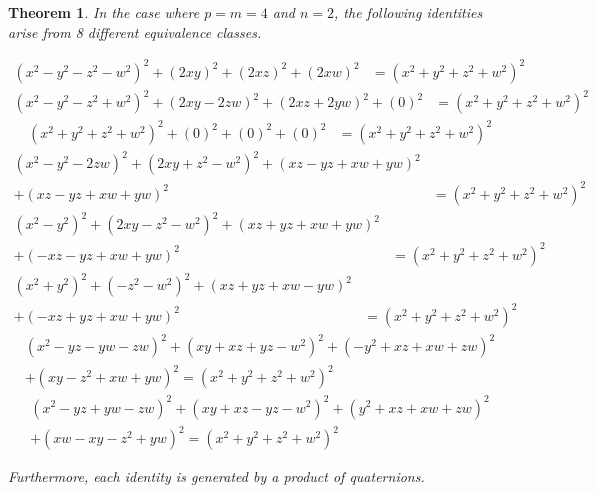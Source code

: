 \documentclass[12pt,table]{article}
\newtheorem{theorem}{Theorem}[section]
\theoremstyle{definition}
\theoremstyle{remark}
\numberwithin{equation}{section}
\begin{document}
\begin{theorem}
\label{theorem_8_classes}
In the case where  $p = m = 4$ and $n = 2$,
the following identities 
arise from 8 different
equivalence classes.

    \begin{align}
    \label{Identity_1}
    (x^2 - y^2 - z^2 - w^2 )^2 + (2xy)^2 + (2xz)^2 + (2xw)^2 
    &= (x^2 + y^2 + z^2 + w^2)^2 
\end{align}
\begin{align}
\label{Identity_2}
    (x^2 - y^2 - z^2 + w^2 )^2 + (2xy - 2zw)^2 + (2xz + 2yw)^2 + (0)^2 
    &= (x^2 + y^2 + z^2 + w^2)^2
\end{align}
\begin{align}
\label{Identity_3}
    (x^2 + y^2 + z^2 + w^2 )^2 + (0)^2 + (0)^2 + (0)^2 
    &= (x^2 + y^2 + z^2 + w^2)^2
\end{align}
\begin{align}
\label{Identity_4}
    (x^2 - y^2 - 2zw )^2 + (2xy + z^2 - w^2)^2 
    + (xz - yz + xw + yw)^2\nonumber
    \\
    + (xz - yz + xw + yw)^2 
        &= (x^2 + y^2 + z^2 + w^2)^2
\end{align}
\begin{align}
\label{Identity_5}
    (x^2 - y^2 )^2 + (2xy - z^2 - w^2)^2 
        + (xz + yz + xw + yw)^2 \nonumber
        \\
        + (-xz - yz + xw + yw)^2 
    &= (x^2 + y^2 + z^2 + w^2)^2
\end{align}
\begin{align}
\label{Identity_6}
    (x^2 + y^2 )^2 + (- z^2 - w^2)^2 
        + (xz + yz + xw - yw)^2  \nonumber
        \\
      + (-xz + yz + xw + yw)^2
    &= (x^2 + y^2 + z^2 + w^2)^2
\end{align}
\begin{align}
\label{Identity_7}
    (x^2 - yz - yw - zw )^2 + (xy + xz + yz - w^2)^2 
        + (-y^2 + xz + xw + zw)^2 \nonumber
        \\
        + (xy - z^2 + xw + yw)^2 
    = (x^2 + y^2 + z^2 + w^2)^2
\end{align}
\begin{align}
\label{Identity_8}
    (x^2 - yz + yw - zw )^2 + (xy + xz - yz - w^2)^2 
        + (y^2 + xz + xw + zw)^2 \nonumber
        \\
        + (xw - xy - z^2  + yw)^2 
            = (x^2 + y^2 + z^2 + w^2)^2
    \end{align}



Furthermore,
each identity
is generated by a product of quaternions. 
\end{theorem}
\end{document}
